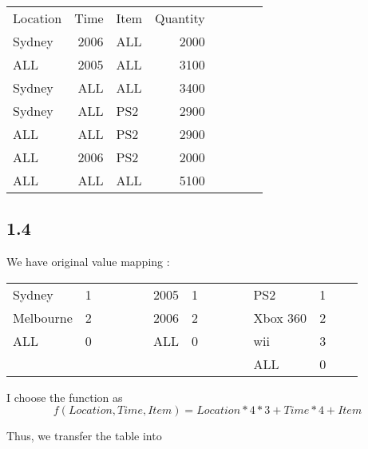\documentclass[a4paper,12pt]{article}
\begin{document}
\begin{Large}
\begin{center}
\begin{tabular}{lrlrlrlr}
Location &  Time &  Item &  Quantity \\

Sydney &  2006 &       ALL &    2000 \\
ALL &   2005 &       ALL &    3100 \\
Sydney &   ALL &       ALL &     3400 \\
Sydney &   ALL &       PS2 &    2900 \\
ALL &   ALL &       PS2 &    2900 \\
ALL &   2006 &       PS2 &    2000 \\
ALL &   ALL &       ALL &    5100\\

\end{tabular}
\end{center}
\end{Large}

\subsection*{1.4}

We have original value mapping :\\
\begin{large}
\begin{center}
\begin{tabular}{llrllrll}

Sydney & 1   &  2005 & 1  &  PS2 & 1\\
Melbourne & 2 \ \ \ \ \ \ \ & 2006 & 2 \ \ \ \ \ \ &  Xbox 360 & 2\\
ALL & 0  &   ALL  & 0  &  wii & 3\\
 {} &{} & {} & {} & ALL & 0   \\

\end{tabular}
\end{center}
\end{large}

I choose the function as \\

\Large $$ f(Location, Time, Item) = Location * 4 * 3 + Time * 4 + Item $$ 



Thus, we transfer the table into\\
\end{document}
